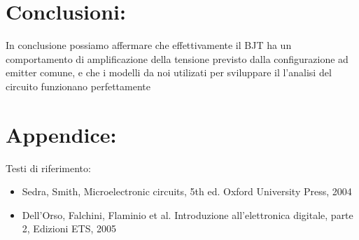 \documentclass{article}
\begin{document}
\section{Conclusioni:}
In conclusione possiamo affermare che effettivamente il BJT ha un comportamento di amplificazione della tensione previsto dalla configurazione ad emitter comune, e che i modelli da noi utilizati per sviluppare il l'analisi del circuito funzionano perfettamente
~
\section{Appendice:}
Testi di riferimento:
\begin{itemize}
    \item Sedra, Smith, Microelectronic circuits, 5th ed. Oxford University Press,
2004
    \item Dell’Orso, Falchini, Flaminio et al. Introduzione all’elettronica digitale,
parte 2, Edizioni ETS, 2005

\end{itemize}
\end{document}
